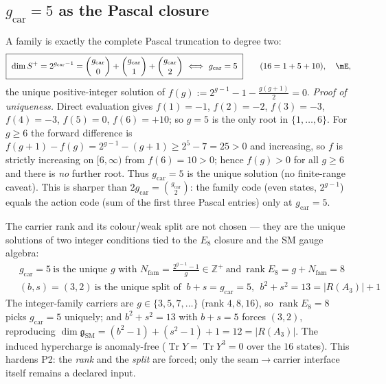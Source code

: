 \documentclass[11pt,a4paper]{article}
\newcommand{\gcar}{g_{\mathrm{car}}}
\newcommand{\Nfam}{N_{\mathrm{fam}}}
\newcommand{\Z}{\mathbb{Z}}
\theoremstyle{definition}
\begin{document}
\subsection{$\gcar=5$ as the Pascal closure}
A family is exactly the complete Pascal truncation to degree two:
\begin{equation}
  \boxed{\ \dim S^+=2^{\gcar-1}=\binom{\gcar}{0}+\binom{\gcar}{1}+\binom{\gcar}{2}\ \Longleftrightarrow\ \gcar=5\ }
  \qquad(16=1+5+10),\quad\mE,
\end{equation}
the unique positive-integer solution of $f(g):=2^{g-1}-1-\tfrac{g(g+1)}{2}=0$. \emph{Proof of
uniqueness.} Direct evaluation gives $f(1){=}{-1}$, $f(2){=}{-2}$, $f(3){=}{-3}$, $f(4){=}{-3}$,
$f(5){=}0$, $f(6){=}{+10}$; so $g{=}5$ is the only root in $\{1,\dots,6\}$. For $g\ge6$ the forward
difference is $f(g{+}1)-f(g)=2^{g-1}-(g{+}1)\ge 2^{5}-7=25>0$ and increasing, so $f$ is strictly
increasing on $[6,\infty)$ from $f(6){=}10>0$; hence $f(g)>0$ for all $g\ge6$ and there is \emph{no}
further root. Thus $\gcar=5$ is the unique solution (no finite-range caveat). 
This is sharper than $2\gcar=\binom{\gcar}{2}$: the family code (even states, $2^{g-1}$) equals the action
code (sum of the first three Pascal entries) only at $\gcar=5$.

\begin{keybox}[Carrier uniqueness theorem: $\gcar=5$ and the $3{+}2$ split are forced \mE]
The carrier rank and its colour/weak split are not chosen --- they are the unique solutions of two
integer conditions tied to the $E_8$ closure and the SM gauge algebra:
\begin{align}
  &\boxed{\ \gcar=5\ \text{is the unique }g\text{ with } \Nfam=\tfrac{2^{g-1}-1}{g}\in\Z^+\ \text{and}\ \operatorname{rank}E_8=g+\Nfam=8\ }\\[2pt]
  &\boxed{\ (b,s)=(3,2)\ \text{is the unique split of }\ b+s=\gcar=5,\ \ b^2+s^2=13=|R(A_3)|{+}1\ }
\end{align}
The integer-family carriers are $g\in\{3,5,7,\dots\}$ (rank $4,8,16$), so $\operatorname{rank}E_8=8$ picks
$\gcar=5$ uniquely; and $b^2+s^2=13$ with $b{+}s=5$ forces $(3,2)$, reproducing
$\dim\mathfrak g_{\mathrm{SM}}=(b^2{-}1)+(s^2{-}1)+1=12=|R(A_3)|$. The induced hypercharge is anomaly-free
($\operatorname{Tr}Y=\operatorname{Tr}Y^3=0$ over the $16$ states). This hardens P2: the \emph{rank} and
the \emph{split} are forced; only the seam$\to$carrier interface itself remains a declared input.
\end{keybox}
\end{document}
